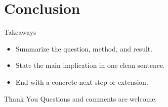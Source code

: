 \section{Conclusion}

\begin{frame}{Takeaways}
  \begin{itemize}
    \item Summarize the question, method, and result.
    \item State the main implication in one clean sentence.
    \item End with a concrete next step or extension.
  \end{itemize}
\end{frame}

\begin{frame}{Thank You}
  \centering
  Questions and comments are welcome.
\end{frame}
